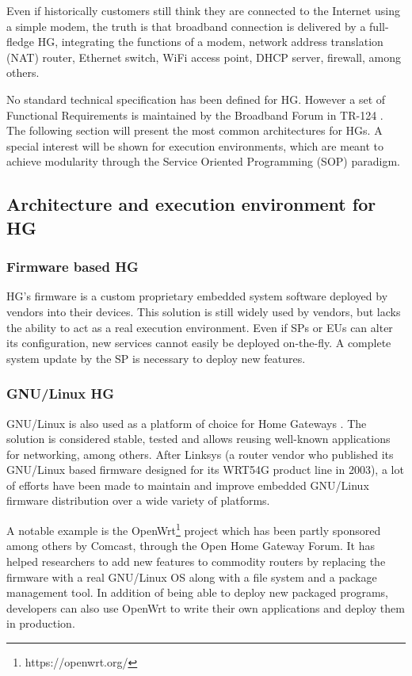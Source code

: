 

Even if historically customers still think they are connected to the Internet using a simple modem, the truth is that broadband connection is delivered by a full-fledge HG, integrating the functions of a modem, network address translation (NAT) router, Ethernet switch, WiFi access point, DHCP server, firewall, among others.
 
No standard technical specification has been defined for HG. However a set of Functional Requirements is maintained by the Broadband Forum in TR-124 \cite{broadband_forum_functional_2014}.
The following section will present the most common architectures for HGs.
A special interest will be shown for execution environments, which are meant to achieve modularity through the Service Oriented Programming (SOP) paradigm.


\subsection{Architecture and execution environment for HG}

\subsubsection{Firmware based HG}
HG's firmware is a custom proprietary embedded system software deployed by vendors into their devices.
This solution is still widely used by vendors, but lacks the ability to act as a real execution environment.
Even if SPs or EUs can alter its configuration, new services cannot easily be deployed on-the-fly.
A complete system update by the SP is necessary to deploy new features.
   
\subsubsection{GNU/Linux HG}
   
GNU/Linux is also used as a platform of choice for Home Gateways \cite{royon_multiservice_2007}.
The solution is considered stable, tested and allows reusing well-known applications for networking, among others.
After Linksys (a router vendor who published its GNU/Linux based firmware designed for its WRT54G product line in 2003), a lot of efforts have been made to maintain and improve embedded GNU/Linux firmware distribution over a wide variety of platforms.

A notable example is the OpenWrt\footnote{https://openwrt.org/} project which has been partly sponsored among others by Comcast, through the Open Home Gateway Forum.
It has helped researchers to add new features to commodity routers by replacing the firmware with a real GNU/Linux OS along with a file system and a package management tool.
In addition of being able to deploy new packaged programs, developers can also use OpenWrt to write their own applications and deploy them in production.


